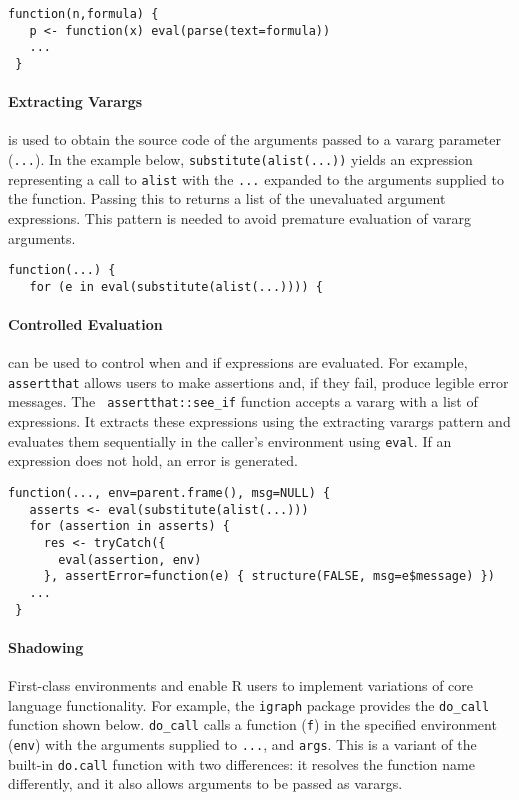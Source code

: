 \documentclass[acmsmall, screen]{acmart}
\renewcommand{\k}[1]{\lstinline |#1|\xspace}
\begin{document}
\begin{lstlisting}[title={\k{AdapSamp::rARS}}, captionpos=b]
 function(n,formula) {
   p <- function(x) eval(parse(text=formula))
   ...
 }
\end{lstlisting}

\paragraph{Extracting Varargs} \Eval is used to obtain the source code of the
arguments passed to a vararg parameter (\k{...}). In the example below,
\k{substitute(alist(...))} yields an expression representing a call to \k{alist}
with the \k{...} expanded to the arguments supplied to the function. Passing
this to \eval returns a list of the unevaluated argument expressions. This
pattern is needed to avoid premature evaluation of vararg arguments.

\begin{lstlisting}[title={\k{statnet.common::NVL}}, captionpos=b]
 function(...) {
   for (e in eval(substitute(alist(...)))) {
\end{lstlisting}

\paragraph{Controlled Evaluation} \Eval can be used to control when and if
expressions are evaluated. For example, \k{assertthat} allows users to make
assertions and, if they fail, produce legible error messages. The \texttt{\small
  assertthat::see\_if} function accepts a vararg with a list of expressions. It
extracts these expressions using the extracting varargs pattern and evaluates
them sequentially in the caller's environment using \k{eval}. If an expression
does not hold, an error is generated.

\begin{lstlisting}[title={\texttt{\small assertthat::see\_if}}, alsoletter={\_}, captionpos=b]
 function(..., env=parent.frame(), msg=NULL) {
   asserts <- eval(substitute(alist(...)))
   for (assertion in asserts) {
     res <- tryCatch({
       eval(assertion, env)
     }, assertError=function(e) { structure(FALSE, msg=e$message) })
   ...
 }
\end{lstlisting}

\paragraph{Shadowing} First-class environments and \eval enable R users to
implement variations of core language functionality. For example, the \k{igraph}
package provides the \k{do_call} function shown below. \k{do_call} calls a
function (\k{f}) in the specified environment (\k{env}) with the arguments
supplied to \k{...}, and \k{args}. This is a variant of the built-in \k{do.call}
function with two differences: it resolves the function name differently, and it
also allows arguments to be passed as varargs.
\end{document}
